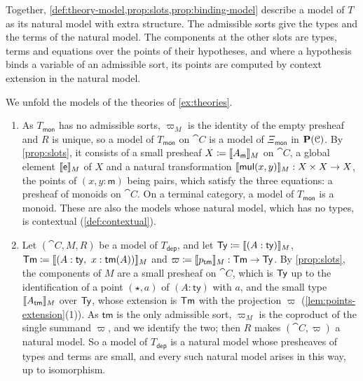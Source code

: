 Together, \cref{def:theory-model,prop:slots,prop:binding-model} describe a model of $T$ as its natural model with extra structure. The admissible sorts give the types and the terms of the natural model. The components at the other slots are types, terms and equations over the points of their hypotheses, and where a hypothesis binds a variable of an admissible sort, its points are computed by context extension in the natural model.

\begin{example}\label{ex:models}
    We unfold the models of the theories of \cref{ex:theories}.
    \begin{enumerate}
        \item As $T_{\mathsf{mon}}$ has no admissible sorts, $\varpi_M$ is the identity of the empty presheaf and $R$ is unique, so a model of $T_{\mathsf{mon}}$ on $\cat{C}$ is a model of $\Xi_{\mathsf{mon}}$ in $\mathbf{P}(\mathcal{C})$. By \cref{prop:slots}, it consists of a small presheaf $X \coloneqq \llbracket A_{\mathsf{m}}\rrbracket_M$ on $\cat{C}$, a global element $\llbracket\mathsf{e}\rrbracket_M$ of $X$ and a natural transformation $\llbracket\mathsf{mul}(x, y)\rrbracket_M : X \times X \to X$, the points of $(x, y : \mathsf{m})$ being pairs, which satisfy the three equations: a presheaf of monoids on $\cat{C}$. On a terminal category, a model of $T_{\mathsf{mon}}$ is a monoid. These are also the models whose natural model, which has no types, is contextual (\cref{def:contextual}).
        \item Let $(\cat{C}, M, R)$ be a model of $T_{\mathsf{dep}}$, and let $\mathsf{Ty} \coloneqq \llbracket(A : \mathsf{ty})\rrbracket_M$, $\mathsf{Tm} \coloneqq \llbracket(A : \mathsf{ty},\ x : \mathsf{tm}(A))\rrbracket_M$ and $\varpi \coloneqq \llbracket p_{\mathsf{tm}}\rrbracket_M : \mathsf{Tm} \to \mathsf{Ty}$. By \cref{prop:slots}, the components of $M$ are a small presheaf on $\cat{C}$, which is $\mathsf{Ty}$ up to the identification of a point $(\star, a)$ of $(A : \mathsf{ty})$ with $a$, and the small type $\llbracket A_{\mathsf{tm}}\rrbracket_M$ over $\mathsf{Ty}$, whose extension is $\mathsf{Tm}$ with the projection $\varpi$ (\cref{lem:points-extension}(1)). As $\mathsf{tm}$ is the only admissible sort, $\varpi_M$ is the coproduct of the single summand $\varpi$, and we identify the two; then $R$ makes $(\cat{C}, \varpi)$ a natural model. So a model of $T_{\mathsf{dep}}$ is a natural model whose presheaves of types and terms are small, and every such natural model arises in this way, up to isomorphism.

\end{enumerate}
\end{example}
